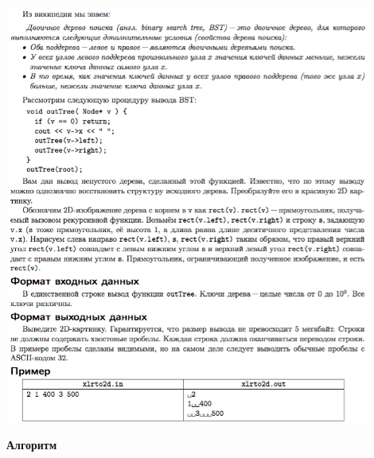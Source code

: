 \documentclass[a4paper,12pt]{article}
\begin{document}
\begin{center}
\includegraphics[width=0.9\textwidth]{OC_Baltics/J.png}\\ [1cm]
\end{center}

\textbf{{\large Алгоритм}}
\end{document}
